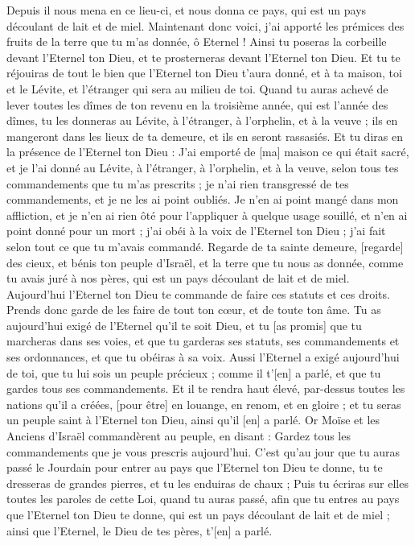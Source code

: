 \begin{multicols}{2}
Depuis il nous mena en ce lieu-ci, et nous donna ce pays, qui est un pays découlant de lait et de miel.
Maintenant donc voici, j'ai apporté les prémices des fruits de la terre que tu m'as donnée, ô Eternel ! Ainsi tu poseras la corbeille devant l'Eternel ton Dieu, et te prosterneras devant l'Eternel ton Dieu.
Et tu te réjouiras de tout le bien que l'Eternel ton Dieu t'aura donné, et à ta maison, toi et le Lévite, et l'étranger qui sera au milieu de toi.
Quand tu auras achevé de lever toutes les dîmes de ton revenu en la troisième année, qui est l'année des dîmes, tu les donneras au Lévite, à l'étranger, à l'orphelin, et à la veuve ; ils en mangeront dans les lieux de ta demeure, et ils en seront rassasiés.
Et tu diras en la présence de l'Eternel ton Dieu : J'ai emporté de [ma] maison ce qui était sacré, et je l'ai donné au Lévite, à l'étranger, à l'orphelin, et à la veuve, selon tous tes commandements que tu m'as prescrits ; je n'ai rien transgressé de tes commandements, et je ne les ai point oubliés.
Je n'en ai point mangé dans mon affliction, et je n'en ai rien ôté pour l'appliquer à quelque usage souillé, et n'en ai point donné pour un mort ; j'ai obéi à la voix de l'Eternel ton Dieu ; j'ai fait selon tout ce que tu m'avais commandé.
Regarde de ta sainte demeure, [regarde] des cieux, et bénis ton peuple d'Israël, et la terre que tu nous as donnée, comme tu avais juré à nos pères, qui est un pays découlant de lait et de miel.
Aujourd'hui l'Eternel ton Dieu te commande de faire ces statuts et ces droits. Prends donc garde de les faire de tout ton cœur, et de toute ton âme.
Tu as aujourd'hui exigé de l'Eternel qu'il te soit Dieu, et tu [as promis] que tu marcheras dans ses voies, et que tu garderas ses statuts, ses commandements et ses ordonnances, et que tu obéiras à sa voix.
Aussi l'Eternel a exigé aujourd'hui de toi, que tu lui sois un peuple précieux ; comme il t'[en] a parlé, et que tu gardes tous ses commandements.
Et il te rendra haut élevé, par-dessus toutes les nations qu'il a créées, [pour être] en louange, en renom, et en gloire ; et tu seras un peuple saint à l'Eternel ton Dieu, ainsi qu'il [en] a parlé.
\VerseOne{}Or Moïse et les Anciens d'Israël commandèrent au peuple, en disant : Gardez tous les commandements que je vous prescris aujourd'hui.
C'est qu'au jour que tu auras passé le Jourdain pour entrer au pays que l'Eternel ton Dieu te donne, tu te dresseras de grandes pierres, et tu les enduiras de chaux ;
Puis tu écriras sur elles toutes les paroles de cette Loi, quand tu auras passé, afin que tu entres au pays que l'Eternel ton Dieu te donne, qui est un pays découlant de lait et de miel ; ainsi que l'Eternel, le Dieu de tes pères, t'[en] a parlé.

\end{multicols}
